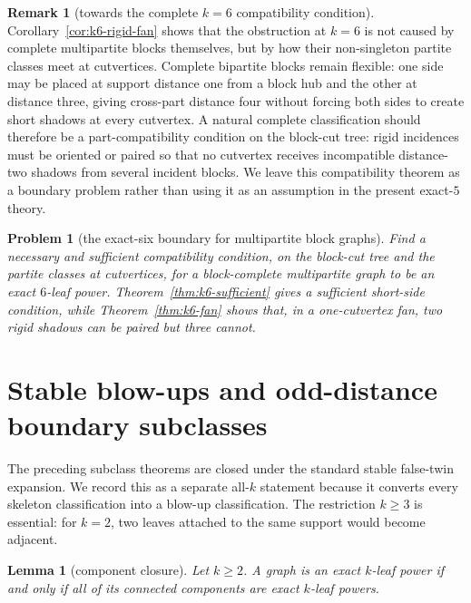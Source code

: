 \documentclass[11pt]{article}
\newtheorem{lemma}[theorem]{Lemma}
\newtheorem{problem}[theorem]{Problem}
\theoremstyle{definition}
\newtheorem{remark}[theorem]{Remark}
\begin{document}
\begin{remark}[towards the complete $k=6$ compatibility condition]
Corollary~\ref{cor:k6-rigid-fan} shows that the obstruction at $k=6$ is not caused by complete multipartite blocks themselves, but by how their non-singleton partite classes meet at cutvertices.  Complete bipartite blocks remain flexible: one side may be placed at support distance one from a block hub and the other at distance three, giving cross-part distance four without forcing both sides to create short shadows at every cutvertex.  A natural complete classification should therefore be a part-compatibility condition on the block-cut tree: rigid incidences must be oriented or paired so that no cutvertex receives incompatible distance-two shadows from several incident blocks.  We leave this compatibility theorem as a boundary problem rather than using it as an assumption in the present exact-$5$ theory.
\end{remark}

\begin{problem}[the exact-six boundary for multipartite block graphs]\label{prob:k6-boundary}
Find a necessary and sufficient compatibility condition, on the block-cut tree and the partite classes at cutvertices, for a block-complete multipartite graph to be an exact $6$-leaf power.  Theorem~\ref{thm:k6-sufficient} gives a sufficient short-side condition, while Theorem~\ref{thm:k6-fan} shows that, in a one-cutvertex fan, two rigid shadows can be paired but three cannot.
\end{problem}


\section{Stable blow-ups and odd-distance boundary subclasses}\label{sec:blowups-boundaries}

The preceding subclass theorems are closed under the standard stable false-twin expansion.  We record this as a separate all-$k$ statement because it converts every skeleton classification into a blow-up classification.  The restriction $k\ge3$ is essential: for $k=2$, two leaves attached to the same support would become adjacent.


\begin{lemma}[component closure]\label{lem:components-k}
Let $k\ge2$.  A graph is an exact $k$-leaf power if and only if all of its connected components are exact $k$-leaf powers.
\end{lemma}
\end{document}
